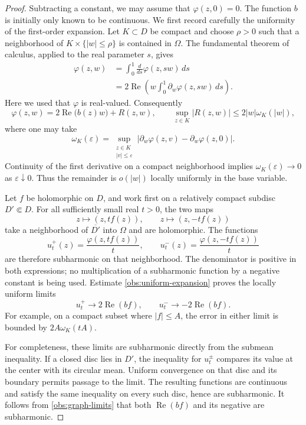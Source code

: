 \documentclass[11pt,a4paper]{article}
\numberwithin{equation}{section}
\theoremstyle{definition}
\theoremstyle{remark}
\begin{document}
\begin{proof}
Subtracting a constant, we may assume that $\varphi(z,0)=0$.  The function
$b$ is initially only known to be continuous.  We first record carefully
the uniformity of the first-order expansion.  Let $K\subset D$ be compact
and choose $\rho>0$ such that a neighborhood of
$K\times\{|w|\leq\rho\}$ is contained in $\Omega$.  The fundamental theorem
of calculus, applied to the real parameter $s$, gives
\begin{align*}
 \varphi(z,w)
 &=\int_0^1\frac{d}{ds}\varphi(z,sw)\,ds\\
 &=2\operatorname{Re}\left(
       w\int_0^1\partial_w\varphi(z,sw)\,ds\right).
\end{align*}
Here we used that $\varphi$ is real-valued.  Consequently
\begin{equation}
\label{obs:uniform-expansion}
 \varphi(z,w)=2\operatorname{Re}\bigl(b(z)w\bigr)+R(z,w),
 \qquad
 \sup_{z\in K}|R(z,w)|\leq 2|w|\omega_K(|w|),
\end{equation}
where one may take
\[
 \omega_K(\varepsilon)=
 \sup_{\substack{z\in K\\ |v|\leq\varepsilon}}
 \bigl|\partial_w\varphi(z,v)-\partial_w\varphi(z,0)\bigr|.
\]
Continuity of the first derivative on a compact neighborhood implies
$\omega_K(\varepsilon)\longrightarrow0$ as $\varepsilon\downarrow0$.
Thus the remainder is $o(|w|)$ locally uniformly in the base variable.

Let $f$ be holomorphic on $D$, and work first on a relatively compact
subdisc $D'\Subset D$.  For all sufficiently small real $t>0$, the two maps
\[
      z\longmapsto (z,t f(z)),\qquad
      z\longmapsto (z,-t f(z))
\]
take a neighborhood of $\overline{D'}$ into $\Omega$ and are holomorphic.
The functions
\[
       u_t^+(z)=\frac{\varphi(z,t f(z))}{t},
       \qquad
       u_t^-(z)=\frac{\varphi(z,-t f(z))}{t}
\]
are therefore subharmonic on that neighborhood.  The denominator is
positive in both expressions; no multiplication of a subharmonic function
by a negative constant is being used.  Estimate
\eqref{obs:uniform-expansion} proves the locally uniform limits
\begin{equation}
\label{obs:graph-limits}
       u_t^+\longrightarrow 2\operatorname{Re}(bf),
       \qquad
       u_t^-\longrightarrow-2\operatorname{Re}(bf).
\end{equation}
For example, on a compact subset where $|f|\leq A$, the error in either
limit is bounded by $2A\omega_K(tA)$.

For completeness, these limits are subharmonic directly from the
submean inequality.  If a closed disc lies in $D'$, the inequality for
$u_t^\pm$ compares its value at the center with its circular mean.
Uniform convergence on that disc and its boundary permits passage to
the limit.  The resulting functions are continuous and satisfy the same
inequality on every such disc, hence are subharmonic.  It follows from
\eqref{obs:graph-limits} that both
$\operatorname{Re}(bf)$ and its negative are subharmonic.


\end{proof}
\end{document}
